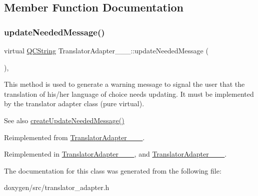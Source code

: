 \subsection{Member Function Documentation}
\mbox{\label{class_translator_adapter__1__6__0_abc231eb2c1864ca9f878e7e5deb94f54}} 
\subsubsection{\texorpdfstring{updateNeededMessage()}{updateNeededMessage()}}
{\footnotesize\ttfamily virtual \mbox{\hyperlink{class_q_c_string}{Q\+C\+String}} Translator\+Adapter\+\_\+\_\+\_\+::update\+Needed\+Message (\begin{DoxyParamCaption}{ }\end{DoxyParamCaption})\hspace{0.3cm}{\ttfamily [inline]}, {\ttfamily [virtual]}}

This method is used to generate a warning message to signal the user that the translation of his/her language of choice needs updating. It must be implemented by the translator adapter class (pure virtual).

\begin{DoxySeeAlso}{See also}
\mbox{\hyperlink{class_translator_adapter_base_a71493b87a34d6e4c232e540734aba698}{create\+Update\+Needed\+Message()}} 
\end{DoxySeeAlso}


Reimplemented from \mbox{\hyperlink{class_translator_adapter__1__6__3_ab3d79abfb926c41bd7609eeb706654fe}{Translator\+Adapter\+\_\+\_\+\_}}.



Reimplemented in \mbox{\hyperlink{class_translator_adapter__1__4__6_ab19b01d4e00c95ef1e6eb631fbe6ada4}{Translator\+Adapter\+\_\+\_\+\_}}, and \mbox{\hyperlink{class_translator_adapter__1__5__4_a587a31dad925e47f206b6a0cda9eedd0}{Translator\+Adapter\+\_\+\_\+\_}}.



The documentation for this class was generated from the following file\+:\begin{DoxyCompactItemize}
\item 
doxygen/src/translator\+\_\+adapter.\+h\end{DoxyCompactItemize}
